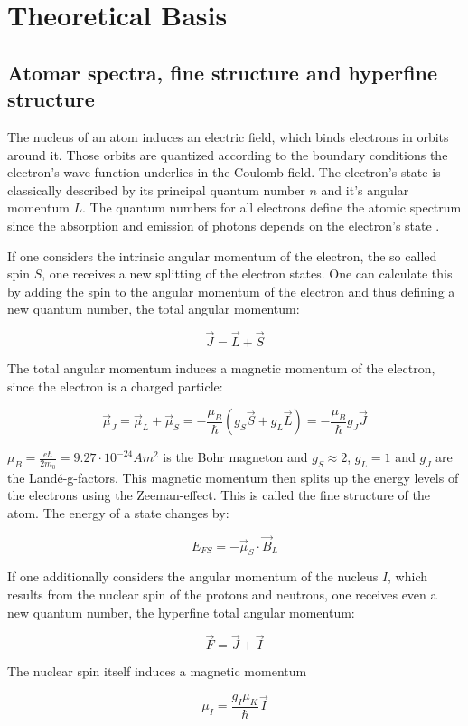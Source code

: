 \section{Theoretical Basis}

\subsection{Atomar spectra, fine structure and hyperfine structure}

The nucleus of an atom induces an electric field, which binds electrons in orbits around it. Those orbits are quantized according to the boundary conditions the electron's wave function underlies in the Coulomb field. The electron's state is classically described by its principal quantum number $n$ and it's angular momentum $L$. The quantum numbers for all electrons define the atomic spectrum since the absorption and emission of photons depends on the electron's state .

If one considers the intrinsic angular momentum of the electron, the so called spin $S$, one receives a new splitting of the electron states. One can calculate this by adding the spin to the angular momentum of the electron and thus defining a new quantum number, the total angular momentum:

$$ \vec J = \vec L + \vec S $$

The total angular momentum induces a magnetic momentum of the electron, since the electron is a charged particle:

$$\vec \mu_J = \vec \mu_L + \vec \mu_S = - \frac{\mu_B}{\hbar}(g_S\vec S + g_L\vec L) = -\frac{\mu_B}{\hbar}g_J\vec J$$

$\mu_B = \frac{e\hbar}{2m_0} = 9.27\cdot10^{-24}Am^2$ is the Bohr magneton and $g_S \approx 2$, $g_L = 1$ and $g_J$ are the Landé-g-factors. This magnetic momentum then splits up the energy levels of the electrons using the Zeeman-effect. This is called the fine structure of the atom. The energy of a state changes by:

$$ E_{FS} = -\vec\mu_S\cdot\vec B_L $$

If one additionally considers the angular momentum of the nucleus $I$, which results from the nuclear spin of the protons and neutrons, one receives even a new quantum number, the hyperfine total angular momentum:

$$ \vec F = \vec J + \vec I $$

The nuclear spin itself induces a magnetic momentum 

$$\mu_I = \frac{g_I\mu_K}{\hbar}\vec I$$


